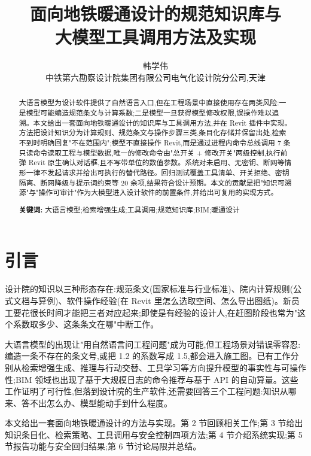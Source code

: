 \documentclass[UTF8,a4paper,zihao=-4]{ctexart}
\title{\heiti 面向地铁暖通设计的规范知识库与\\大模型工具调用方法及实现}
\author{韩学伟\\[2pt] \small 中铁第六勘察设计院集团有限公司电气化设计院分公司,天津}
\date{}
\begin{document}
\maketitle

\begin{abstract}
\noindent
大语言模型为设计软件提供了自然语言入口,但在工程场景中直接使用存在两类风险:一是模型可能编造规范条文与计算系数;二是模型一旦获得模型修改权限,误操作难以追溯。本文给出一套面向地铁暖通设计的知识库与工具调用方法,并在 Revit 插件中实现。方法把设计知识分为计算规则、规范条文与操作步骤三类,条目化存储并保留出处,检索不到时明确回复"不在范围内";模型不直接操作 Revit,而是通过进程内命令总线调用 7 条只读命令读取工程与模型数据,唯一的修改命令由"总开关 + 修改开关"两级控制,执行前弹 Revit 原生确认对话框,且不写带单位的数值参数。系统对未启用、无密钥、断网等情形一律不发起请求并给出可执行的替代路径。回归测试覆盖工具清单、开关拒绝、密钥隔离、断网降级与提示词约束等 20 余项,结果符合设计预期。本文的贡献是把"知识可溯源"与"操作可审计"作为大模型进入设计软件的前置条件,并给出可复用的实现方式。
\vspace{0.5em}

\noindent\textbf{关键词:} 大语言模型;检索增强生成;工具调用;规范知识库;BIM;暖通设计
\end{abstract}

\section{引言}

设计院的知识以三种形态存在:规范条文(国家标准与行业标准)、院内计算规则(公式文档与算例)、软件操作经验(在 Revit 里怎么选取空间、怎么导出图纸)。新员工要花很长时间才能把三者对应起来;即使是有经验的设计人,在赶图阶段也常为"这个系数取多少、这条条文在哪"中断工作。

大语言模型的出现让"用自然语言问工程问题"成为可能,但工程场景对错误零容忍:编造一条不存在的条文号,或把 1.2 的系数写成 1.5,都会进入施工图。已有工作分别从检索增强生成\cite{lewis2020rag}、推理与行动交替\cite{yao2022react}、工具学习\cite{schick2023toolformer}等方向提升模型的事实性与可操作性;BIM 领域也出现了基于大规模日志的命令推荐\cite{du2025bimcommand}与基于 API 的自动算量\cite{taghaddos2019}。这些工作证明了可行性,但落到设计院的生产软件,还需要回答三个工程问题:知识从哪来、答不出怎么办、模型能动手到什么程度。

本文给出一套面向地铁暖通设计的方法与实现。第 2 节回顾相关工作;第 3 节给出知识条目化、检索策略、工具调用与安全控制四项方法;第 4 节介绍系统实现;第 5 节报告功能与安全回归结果;第 6 节讨论局限并总结。
\end{document}
